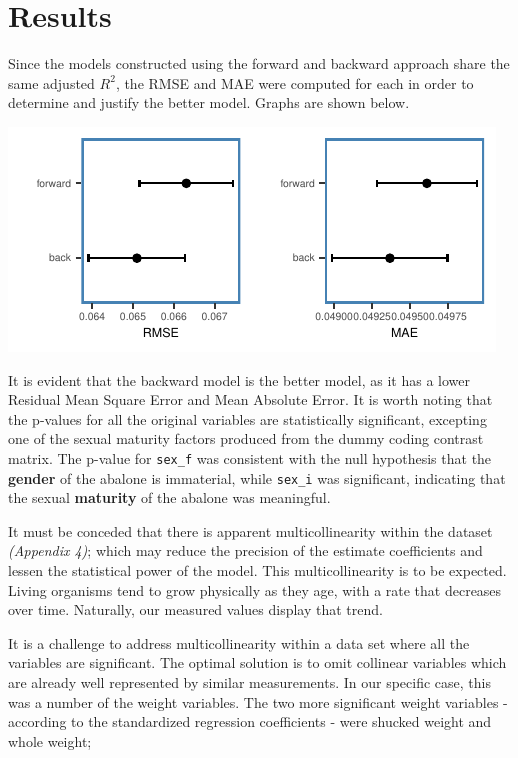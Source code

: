 \documentclass[letterpaper,9pt,twocolumn,twoside,]{pinp}
\begin{document}
\hypertarget{results}{%
\section{Results}\label{results}}

Since the models constructed using the forward and backward approach
share the same adjusted \(R^2\), the RMSE and MAE were computed for each
in order to determine and justify the better model. Graphs are shown
below.

\begin{center}\includegraphics{ExecSum_files/figure-latex/unnamed-chunk-8-1} \end{center}

It is evident that the backward model is the better model, as it has a
lower Residual Mean Square Error and Mean Absolute Error. It is worth
noting that the p-values for all the original variables are
statistically significant, excepting one of the sexual maturity factors
produced from the dummy coding contrast matrix. The p-value for
\texttt{sex\_f} was consistent with the null hypothesis that the
\textbf{gender} of the abalone is immaterial, while \texttt{sex\_i} was
significant, indicating that the sexual \textbf{maturity} of the abalone
was meaningful.

\par

It must be conceded that there is apparent multicollinearity within the
dataset \emph{(Appendix 4)}; which may reduce the precision of the
estimate coefficients and lessen the statistical power of the model.
This multicollinearity is to be expected. Living organisms tend to grow
physically as they age, with a rate that decreases over time. Naturally,
our measured values display that trend.

\par

It is a challenge to address multicollinearity within a data set where
all the variables are significant. The optimal solution is to omit
collinear variables which are already well represented by similar
measurements. In our specific case, this was a number of the weight
variables. The two more significant weight variables - according to the
standardized regression coefficients - were shucked weight and whole
weight;
\end{document}

